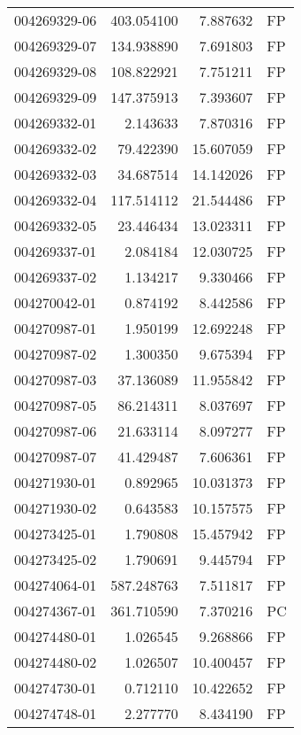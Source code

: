 \begin{tabular}{lrrl}
004269329-06 &  403.054100 &       7.887632 &   FP \\
004269329-07 &  134.938890 &       7.691803 &   FP \\
004269329-08 &  108.822921 &       7.751211 &   FP \\
004269329-09 &  147.375913 &       7.393607 &   FP \\
004269332-01 &    2.143633 &       7.870316 &   FP \\
004269332-02 &   79.422390 &      15.607059 &   FP \\
004269332-03 &   34.687514 &      14.142026 &   FP \\
004269332-04 &  117.514112 &      21.544486 &   FP \\
004269332-05 &   23.446434 &      13.023311 &   FP \\
004269337-01 &    2.084184 &      12.030725 &   FP \\
004269337-02 &    1.134217 &       9.330466 &   FP \\
004270042-01 &    0.874192 &       8.442586 &   FP \\
004270987-01 &    1.950199 &      12.692248 &   FP \\
004270987-02 &    1.300350 &       9.675394 &   FP \\
004270987-03 &   37.136089 &      11.955842 &   FP \\
004270987-05 &   86.214311 &       8.037697 &   FP \\
004270987-06 &   21.633114 &       8.097277 &   FP \\
004270987-07 &   41.429487 &       7.606361 &   FP \\
004271930-01 &    0.892965 &      10.031373 &   FP \\
004271930-02 &    0.643583 &      10.157575 &   FP \\
004273425-01 &    1.790808 &      15.457942 &   FP \\
004273425-02 &    1.790691 &       9.445794 &   FP \\
004274064-01 &  587.248763 &       7.511817 &   FP \\
004274367-01 &  361.710590 &       7.370216 &   PC \\
004274480-01 &    1.026545 &       9.268866 &   FP \\
004274480-02 &    1.026507 &      10.400457 &   FP \\
004274730-01 &    0.712110 &      10.422652 &   FP \\
004274748-01 &    2.277770 &       8.434190 &   FP \\

\end{tabular}
